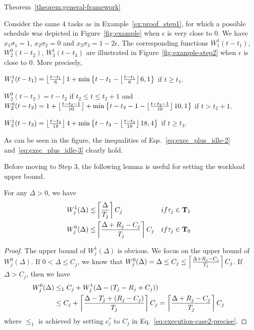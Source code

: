 \begin{appProof}{Theorem~\ref{theorem:general-framework}}
\begin{example}
Consider the same 4 tasks as in Example~\ref{ex:proof_step1}, for which a possible schedule was depicted in Figure~\ref{fig:example} when $\epsilon$ is very close to $0$. We have $x_1\sigma_1=1$, $x_2\sigma_2=0$ and $x_3\sigma_3=1-2\epsilon$. The corresponding functions
$W_1^1(t-t_1)$, $W_2^0(t-t_2)$, $W_3^1(t-t_3)$ are illustrated in
Figure~\ref{fig:example-step2} when $\epsilon$ is close to $0$. More precisely,
{\footnotesize \begin{compactitem}
  \item $W_1^1(t-t_1) = \left\lfloor{\frac{t-t_1}{6}}\right\rfloor1 + \min\left\{t-t_1-\left\lfloor{\frac{t-t_1}{6}}\right\rfloor6, 1\right\}$ if $t \geq t_1$.
  \item $W_2^0(t-t_2) = t-t_2$ if $t_2 \leq t \leq t_2 + 1$ and $W_2^0(t-t_2) = 1 + \left\lfloor{\frac{t-t_2-1}{10}}\right\rfloor + \min\left\{t-t_2-1-\left\lfloor{\frac{t-t_2-1}{10}}\right\rfloor10, 1\right\}$ if $t > t_2+1$.
  \item $W_3^1(t-t_3) = \left\lfloor{\frac{t-t_3}{18}}\right\rfloor4 + \min\left\{t-t_3-\left\lfloor{\frac{t-t_3}{18}}\right\rfloor18, 4\right\}$ if $t \geq t_3$.
\end{compactitem}
}As can be seen in the figure, the inequalities of Eqs.~\eqref{eq:exec_plus_idle-2} and~\eqref{eq:exec_plus_idle-3} clearly hold.\myendproof
\end{example}


Before moving to Step 3, the following lemma is useful for setting the workload upper bound.
\begin{Lemma}
  \label{lemma:W_0-and-W_1-upper}
For any $\Delta > 0$, we have
\begin{align}
  W_j^1(\Delta)  \leq &\ceiling{\frac{\Delta}{T_j}}C_j & \mbox{ if } \tau_j \in {\bf T}_1   \label{eq:W_1-upper}\\
  W_j^0(\Delta)  \leq &\ceiling{\frac{\Delta+R_j-C_j}{T_j}}C_j & \mbox{ if } \tau_j \in {\bf T}_0   \label{eq:W_0-upper}
\end{align}
\end{Lemma}
\begin{proof}
  The upper bound of $W_j^1(\Delta)$ is obvious. We focus on the upper bound of $W_j^0(\Delta)$. If $0 < \Delta \leq C_j$, we know that $W_j^0(\Delta) = \Delta \leq C_j \leq \left\lceil{\frac{\Delta+R_j-C_j}{T_j}}\right\rceil C_j$. If $\Delta > C_j$, then we have
{\small \begin{align*}
W_j^0(\Delta) &\leq_1 C_j + W_j^1(\Delta - (T_j-R_j+C_j))\nonumber\\
& \leq C_j+\left\lceil{\frac{\Delta-T_j +(R_j-C_j)}{T_j}}\right\rceil C_j  = \left\lceil{\frac{\Delta+R_j-C_j}{T_j}}\right\rceil C_j 
\end{align*}} where $\leq_1$ is achieved by setting
$c_j^*$ to $C_j$ in Eq.~\eqref{eq:execution-case2-precise}.
\end{proof}


\end{appProof}

